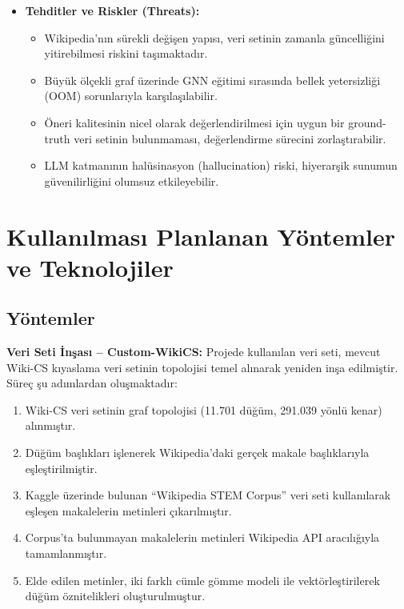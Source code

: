 \documentclass[12pt, a4paper]{article}
\begin{document}
\begin{itemize}
    \item \textbf{Tehditler ve Riskler (Threats):}
    \begin{itemize}
        \item Wikipedia'nın sürekli değişen yapısı, veri setinin zamanla güncelliğini yitirebilmesi riskini taşımaktadır.
        \item Büyük ölçekli graf üzerinde GNN eğitimi sırasında bellek yetersizliği (OOM) sorunlarıyla karşılaşılabilir.
        \item Öneri kalitesinin nicel olarak değerlendirilmesi için uygun bir ground-truth veri setinin bulunmaması, değerlendirme sürecini zorlaştırabilir.
        \item LLM katmanının halüsinasyon (hallucination) riski, hiyerarşik sunumun güvenilirliğini olumsuz etkileyebilir.
    \end{itemize}
\end{itemize}

\section{Kullanılması Planlanan Yöntemler ve Teknolojiler}

\subsection{Yöntemler}

\textbf{Veri Seti İnşası -- Custom-WikiCS:}
Projede kullanılan veri seti, mevcut Wiki-CS \cite{mernyei2020wikics} kıyaslama veri setinin topolojisi temel alınarak yeniden inşa edilmiştir. Süreç şu adımlardan oluşmaktadır:
\begin{enumerate}
    \item Wiki-CS veri setinin graf topolojisi (11.701 düğüm, 291.039 yönlü kenar) alınmıştır.
    \item Düğüm başlıkları işlenerek Wikipedia'daki gerçek makale başlıklarıyla eşleştirilmiştir.
    \item Kaggle üzerinde bulunan ``Wikipedia STEM Corpus'' veri seti kullanılarak eşleşen makalelerin metinleri çıkarılmıştır.
    \item Corpus'ta bulunmayan makalelerin metinleri Wikipedia API aracılığıyla tamamlanmıştır.
    \item Elde edilen metinler, iki farklı cümle gömme modeli ile vektörleştirilerek düğüm öznitelikleri oluşturulmuştur.
\end{enumerate}
\end{document}

